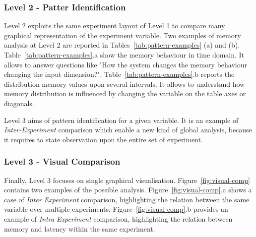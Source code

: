 \subsubsection{Level 2 - Patter Identification}\label{sec:impl-level2}

%  	



\noindent Level 2 exploits the same experiment layout of Level 1 to compare many graphical representation of the experiment variable. Two examples of memory analysis at Level 2 are reported in Tables~\ref{tab:pattern-examples} (a) and (b). Table~\ref{tab:pattern-examples}.a show the memory behaviour in time domain. It allows to answer questions like "How the system changes the memory behaviour changing the input dimension?". Table~\ref{tab:pattern-examples}.b reports the distribution memory values upon several intervals. It allows to understand how memory distribution is influenced by changing the variable on the table axes or diagonals.

Level 3 aims of pattern identification for a given variable. It is an example of \textit{Inter-Experiment} comparison which enable a new kind of global analysis, because it requires to state observation upon the entire set of experiment.

\subsubsection{Level 3 - Visual Comparison}\label{sec:impl-level3}

\noindent Finally, Level 3 focuses on single graphical visualisation. Figure~\ref{fig:visual-comp} contains two examples of the possible analysis. Figure~\ref{fig:visual-comp}.a shows a case of \textit{Inter Experiment} comparison, highlighting the relation between the same variable over multiple experiments; Figure~\ref{fig:visual-comp}.b provides an example of \textit{Intra Experiment} comparison, highlighting the relation between memory and latency within the same experiment.

